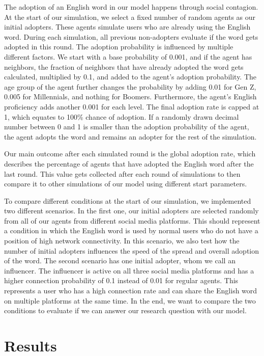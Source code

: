 \documentclass[12pt]{article}
\begin{document}
The adoption of an English word in our model happens through social contagion. At the start of our simulation, we select a fixed number of random agents as our initial adopters. These agents simulate users who are already using the English word. During each simulation, all previous non-adopters evaluate if the word gets adopted in this round. The adoption probability is influenced by multiple different factors. We start with a base probability of 0.001, and if the agent has neighbors, the fraction of neighbors that have already adopted the word gets calculated, multiplied by 0.1, and added to the agent's adoption probability. The age group of the agent further changes the probability by adding 0.01 for Gen Z, 0.005 for Millennials, and nothing for Boomers. Furthermore, the agent's English proficiency adds another 0.001 for each level. The final adoption rate is capped at 1, which equates to 100\% chance of adoption. If a randomly drawn decimal number between 0 and 1 is smaller than the adoption probability of the agent, the agent adopts the word and remains an adopter for the rest of the simulation.

Our main outcome after each simulated round is the global adoption rate, which describes the percentage of agents that have adopted the English word after the last round. This value gets collected after each round of simulations to then compare it to other simulations of our model using different start parameters.

To compare different conditions at the start of our simulation, we implemented two different scenarios. In the first one, our initial adopters are selected randomly from all of our agents from different social media platforms. This should represent a condition in which the English word is used by normal users who do not have a position of high network connectivity. In this scenario, we also test how the number of initial adopters influences the speed of the spread and overall adoption of the word. The second scenario has one initial adopter, whom we call an influencer. The influencer is active on all three social media platforms and has a higher connection probability of 0.1 instead of 0.01 for regular agents. This represents a user who has a high connection rate and can share the English word on multiple platforms at the same time. In the end, we want to compare the two conditions to evaluate if we can answer our research question with our model.

\section{Results}
\end{document}
